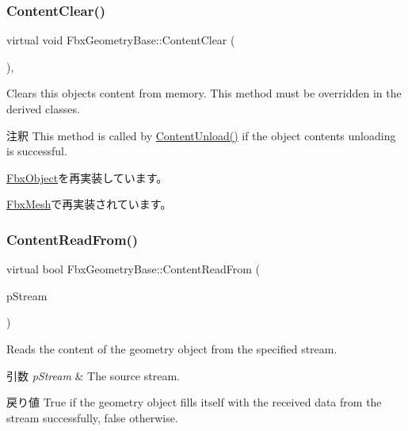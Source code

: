 \subsubsection{\texorpdfstring{Content\+Clear()}{ContentClear()}}
{\footnotesize\ttfamily virtual void Fbx\+Geometry\+Base\+::\+Content\+Clear (\begin{DoxyParamCaption}{ }\end{DoxyParamCaption})\hspace{0.3cm}{\ttfamily [protected]}, {\ttfamily [virtual]}}

Clears this object\textquotesingle{}s content from memory. This method must be overridden in the derived classes. \begin{DoxyRemark}{注釈}
This method is called by \hyperlink{class_fbx_object_ac28653a3c65e840498eebfb54276e483}{Content\+Unload()} if the object content\textquotesingle{}s unloading is successful. 
\end{DoxyRemark}


\hyperlink{class_fbx_object_a284f2a438579fcacd8bffd85f556dde2}{Fbx\+Object}を再実装しています。



\hyperlink{class_fbx_mesh_aacd77ff7908d897c73983919c4aade72}{Fbx\+Mesh}で再実装されています。

\mbox{\label{class_fbx_geometry_base_a6d34ab23d253b07cac24267177096c1a}} 
\subsubsection{\texorpdfstring{Content\+Read\+From()}{ContentReadFrom()}}
{\footnotesize\ttfamily virtual bool Fbx\+Geometry\+Base\+::\+Content\+Read\+From (\begin{DoxyParamCaption}\item[{const \hyperlink{class_fbx_stream}{Fbx\+Stream} \&}]{p\+Stream }\end{DoxyParamCaption})\hspace{0.3cm}{\ttfamily [virtual]}}

Reads the content of the geometry object from the specified stream. 
\begin{DoxyParams}{引数}
{\em p\+Stream} & The source stream. \\
\hline
\end{DoxyParams}
\begin{DoxyReturn}{戻り値}
{\ttfamily True} if the geometry object fills itself with the received data from the stream successfully, {\ttfamily false} otherwise. 
\end{DoxyReturn}



